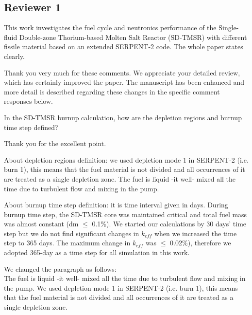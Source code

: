 \documentclass[answers,11pt]{exam}
\begin{document}
\begin{questions}
        \section*{Reviewer 1}

        \question This work investigates the fuel cycle and neutronics performance of the Single-fluid Double-zone Thorium-based Molten Salt Reactor (SD-TMSR) with different fissile material based on an extended SERPENT-2 code. The whole paper states clearly.

        \begin{solution}
                Thank you very much for these comments. We appreciate your detailed review, which has certainly improved the paper. The manuscript has been enhanced and more detail is described regarding these changes in the specific comment responses below.
        \end{solution}


        \question In the SD-TMSR burnup calculation, how are the depletion regions and burnup time step defined?
        \begin{solution}
        		  
        		  Thank you for the excellent point.
        		  
        		  About depletion regions definition: we used depletion mode 1 in SERPENT-2 (i.e. burn 1), this means that the fuel material is not divided and all occurrences of it are treated as a single depletion zone. The fuel is liquid -it well- mixed all the time due to turbulent flow and mixing in the pump.
        		  
        		  About burnup time step definition: it is time interval given in days. During burnup time step, the SD-TMSR core was maintained critical and total fuel mass was almost constant (dm $\leq$ 0.1\%). We started our calculations by 30 days' time step but we do not find significant changes in $k_{eff}$ when we increased the time step to 365 days. The maximum change in $k_{eff}$ was $\leq$ 0.02\%), therefore we adopted 365-day as a time step for all simulation in this work.
    
        		  We changed the paragraph as follows:\\
        		  
        		  The fuel is liquid -it well- mixed all the time due to turbulent flow and mixing in the pump. We used depletion mode 1 in SERPENT-2 (i.e. burn 1), this means that the fuel material is not divided and all occurrences of it are treated as a single depletion zone.
        		  

\end{solution}
\end{questions}
\end{document}
